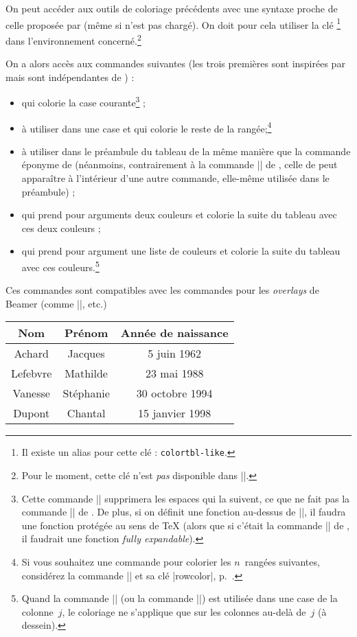 \documentclass[dvipsnames]{article}%
\begin{document}
On peut accéder aux outils de coloriage précédents avec une syntaxe proche de
celle proposée par  (même si  n'est pas chargé). On
doit pour cela utiliser la clé \footnote{Il existe un
  alias pour cette clé : \texttt{colortbl-like}.} dans l'environnement
concerné.\footnote{Pour le moment, cette clé n'est \emph{pas} disponible dans
  |\NiceMatrixOptions|.}

On a alors accès aux commandes suivantes (les trois premières sont inspirées par
 mais sont indépendantes de ) :
\begin{itemize}
\item {} qui colorie la case courante\footnote{Cette
  commande |\cellcolor| supprimera les espaces qui la suivent, ce que ne fait
  pas la commande |\cellcolor| de . De plus, si on définit une
  fonction au-dessus de |\cellcolor|, il faudra une fonction protégée au sens de
TeX (alors que si c'était la commande |\cellcolor| de , il
faudrait une fonction \emph{fully expandable}).} ;
\item {} à utiliser dans une case et qui colorie le
reste de la rangée;\footnote{Si vous souhaitez une commande pour colorier les
  $n$~rangées suivantes, considérez la commande |\RowStyle| et sa clé
  |rowcolor|, p.~\pageref{RowStyle}.} 
\item {} à utiliser dans le préambule du tableau
de la même manière que la commande éponyme de  (néanmoins,
contrairement à la commande |\columncolor| de , celle de
 peut apparaître à l'intérieur d'une autre commande, elle-même
utilisée dans le préambule) ;
\item {} qui prend pour arguments deux couleurs et
colorie la suite du tableau avec ces deux couleurs ;
\item {} qui prend pour argument une liste de
couleurs et colorie la suite du tableau avec ces couleurs.\footnote{Quand la
  commande |\rowlistcolors| (ou la commande |\rowcolors|) est utilisée dans une
  case de la colonne~$j$, le coloriage ne s'applique que sur les colonnes
  au-delà de~$j$ (à dessein).}
\end{itemize}
Ces commandes sont compatibles avec les commandes pour les \emph{overlays} de
Beamer (comme |\only|, etc.)

\medskip
\begin{Code}
\NewDocumentCommand { \Blue } { } {\emph{}}
\begin{NiceTabular}{>{\Blue}c>{\Blue}cc}
\toprule
\emph{}
Nom & Prénom & Année de naissance \\
\midrule
Achard & Jacques & 5 juin 1962 \\
Lefebvre & Mathilde & 23 mai 1988 \\
Vanesse & Stéphanie & 30 octobre 1994 \\
Dupont & Chantal & 15 janvier 1998 \\
\bottomrule
\end{NiceTabular}
\end{Code}
\end{document}

